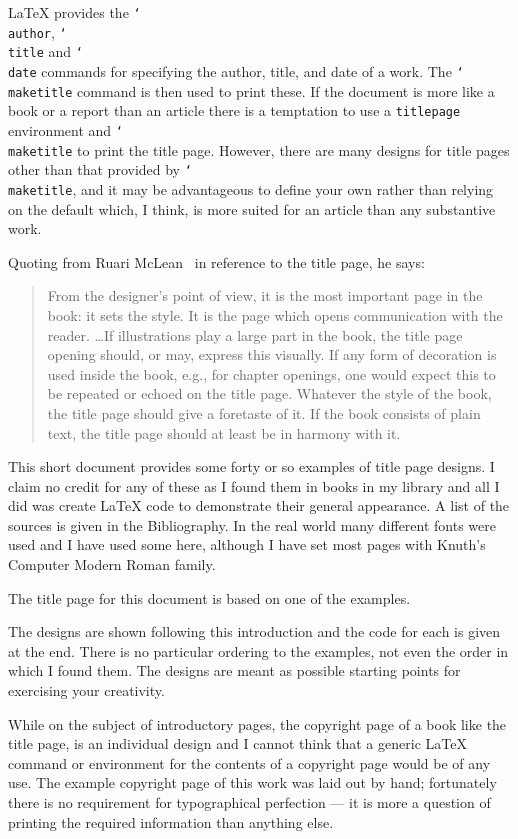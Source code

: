 \documentclass{memoir}
\DeclareRobustCommand{\cs}[1]{\texttt{\char`\\#1}}
\begin{document}
    \LaTeX{} provides the \cs{author}, \cs{title} and \cs{date} commands
for specifying the author, title, and date of a work. The \cs{maketitle}
command is then used to print these. If the document is more like a book
or a report than an article there is a temptation to use a \texttt{titlepage}
environment and \cs{maketitle} to print the title page. However, there are
many designs for title pages other than that provided by \cs{maketitle}, and
it may be advantageous to define your own rather than relying on the default
which, I think, is more suited for an article than any substantive work.

Quoting from Ruari McLean~\cite{MCLEAN80} in reference to the title page, he says:
\begin{quote}
From the designer's point of view, it is the most important page in the book:
it sets the style. It is the page which opens communication with the reader.
\ldots If illustrations play a large part in the book, the title page opening
should, or may, express this visually. If any form of decoration is used inside
the book, e.g., for chapter openings, one would expect this to be repeated
or echoed on the title page. Whatever the style of the book, the title page
should give a foretaste of it. If the book consists of plain text, the title
page should at least be in harmony with it.
\end{quote}

This short document provides some forty or so examples of title page designs.
I claim no credit for any of these as I found them in books in my
library and all I did was create \LaTeX{} code to demonstrate their
general appearance. A list of the sources is given in the Bibliography.
In the real world many different fonts were used
and I have used some here, although I have set most pages with
Knuth's Computer Modern Roman family.

    The title page for this document is based on one of the examples.

   The designs are shown following this introduction and the code for
each is
given at the end. There is no particular ordering to the examples, not
even the order in which I found them. The designs are meant as possible
starting points for exercising your creativity.

    While on the subject of introductory pages, the copyright page of a book
like the title page, is an individual
design and I cannot think that a generic \LaTeX{} command or environment
for the contents of a copyright page would be of any use. The example
copyright page of this work was laid out by hand; fortunately there is
no requirement for typographical perfection --- it is more a question of
printing the required information than anything else.
\end{document}
